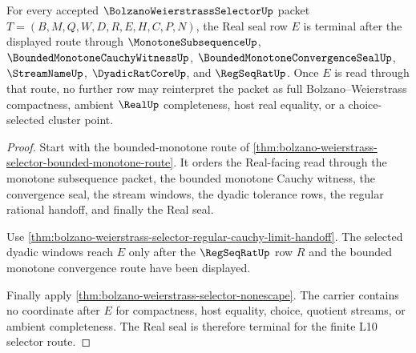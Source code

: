 \begin{theorem}
\label{thm:bolzano-weierstrass-selector-real-seal-finality}
For every accepted $\BolzanoWeierstrassSelectorUp$ packet $T=(B,M,Q,W,D,R,E,H,C,P,N)$, the Real seal row $E$ is terminal after the displayed route through $\MonotoneSubsequenceUp$, $\BoundedMonotoneCauchyWitnessUp$, $\BoundedMonotoneConvergenceSealUp$, $\StreamNameUp$, $\DyadicRatCoreUp$, and $\RegSeqRatUp$. Once $E$ is read through that route, no further row may reinterpret the packet as full Bolzano--Weierstrass compactness, ambient $\RealUp$ completeness, host real equality, or a choice-selected cluster point.
\end{theorem}
\begin{proof}
Start with the bounded-monotone route of \autoref{thm:bolzano-weierstrass-selector-bounded-monotone-route}. It orders the Real-facing read through the monotone subsequence packet, the bounded monotone Cauchy witness, the convergence seal, the stream windows, the dyadic tolerance rows, the regular rational handoff, and finally the Real seal.

Use \autoref{thm:bolzano-weierstrass-selector-regular-cauchy-limit-handoff}. The selected dyadic windows reach $E$ only after the $\RegSeqRatUp$ row $R$ and the bounded monotone convergence route have been displayed.

Finally apply \autoref{thm:bolzano-weierstrass-selector-nonescape}. The carrier contains no coordinate after $E$ for compactness, host equality, choice, quotient streams, or ambient completeness. The Real seal is therefore terminal for the finite L10 selector route.
\end{proof}

